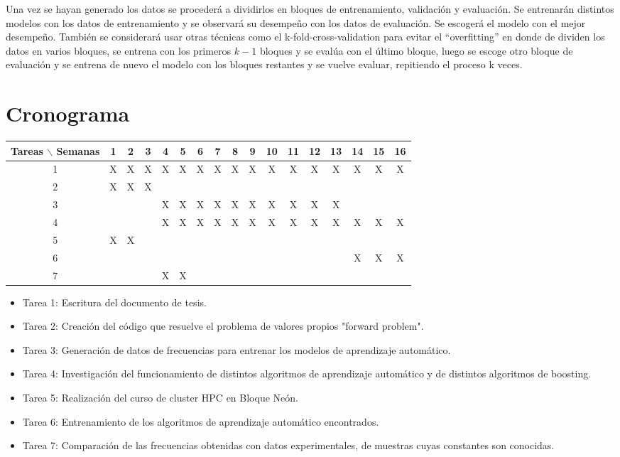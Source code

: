 \documentclass[12pt]{article}
\begin{document}
Una vez se hayan generado los datos se procederá a dividirlos en bloques de entrenamiento, validación y evaluación. Se entrenarán distintos modelos con los datos de entrenamiento y se observará su desempeño con los datos de evaluación. Se escogerá el modelo con el mejor desempeño. También se considerará usar otras técnicas como el k-fold-cross-validation para evitar el ``overfitting'' en donde de dividen los datos en varios bloques, se entrena con los primeros $k-1$ bloques y se evalúa con el último bloque, luego se escoge otro bloque de evaluación y se entrena de nuevo el modelo con los bloques restantes y se vuelve evaluar, repitiendo el proceso k veces.  



\section{Cronograma}

\begin{table}[H]
	\begin{tabular}{|c|cccccccccccccccc| }
	\hline
	Tareas $\backslash$ Semanas & 1 & 2 & 3 & 4 & 5 & 6 & 7 & 8 & 9 & 10 & 11 & 12 & 13 & 14 & 15 & 16  \\
	\hline
	1 & X & X & X & X & X & X & X & X & X & X & X & X & X & X & X & X \\
	2 & X & X & X &   &   &   &   &   &   &   &   &   &   &   &   &   \\
	3 &   &   &   & X & X & X & X & X & X & X & X & X & X &   &   &   \\
	4 &   &   &   & X & X & X & X & X & X & X & X & X & X & X & X & X \\
	5 & X & X &   &   &   &   &   &   &   &   &   &   &   &   &   &   \\
	6 &   &   &   &   &   &   &   &   &   &   &   &   &   & X & X & X \\
	7 &   &   &   & X & X &   &   &   &   &   &   &   &   &   &   &   \\
	\hline
	\end{tabular}
\end{table}
\vspace{1mm}

\begin{itemize}
	\item Tarea 1: Escritura del documento de tesis.
	\item Tarea 2: Creación del código que resuelve el problema de valores propios "forward problem".
	\item Tarea 3: Generación de datos de frecuencias para entrenar los modelos de aprendizaje automático.
	\item Tarea 4: Investigación del funcionamiento de distintos algoritmos de aprendizaje automático y de distintos algoritmos de boosting.
	\item Tarea 5: Realización del curso de cluster HPC en Bloque Neón.
	\item Tarea 6: Entrenamiento de los algoritmos de aprendizaje automático encontrados.
	\item Tarea 7: Comparación de las frecuencias obtenidas con datos experimentales, de muestras cuyas constantes son conocidas. 
\end{itemize} 
\end{document}
